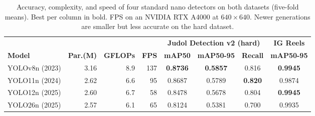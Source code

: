 \begin{table}[t]
\caption{Accuracy, complexity, and speed of four standard nano detectors on both datasets (five-fold means). Best per column in bold. FPS on an NVIDIA RTX A4000 at $640\times640$. Newer generations are smaller but less accurate on the hard dataset.}
\label{tab:main}
\centering\footnotesize\renewcommand{\arraystretch}{1.3}
\begin{tabular}{@{}lrrrcccc@{}}
\toprule
& & & & \multicolumn{3}{c}{\textbf{Judol Detection v2 (hard)}} & \textbf{IG Reels} \\
\cmidrule(lr){5-7}\cmidrule(lr){8-8}
\textbf{Model} & \textbf{Par.(M)} & \textbf{GFLOPs} & \textbf{FPS} & \textbf{mAP50} & \textbf{mAP50-95} & \textbf{Recall} & \textbf{mAP50-95} \\
\midrule
YOLOv8n (2023) & 3.16 & 8.9 & 137 & \textbf{0.8736} & \textbf{0.5857} & 0.816 & \textbf{0.9945} \\
YOLO11n (2024) & 2.62 & 6.6 & 95 & 0.8687 & 0.5789 & \textbf{0.820} & 0.9874 \\
YOLO12n (2025) & 2.60 & 6.7 & 58 & 0.8478 & 0.5678 & 0.804 & \textbf{0.9945} \\
YOLO26n (2025) & 2.57 & 6.1 & 65 & 0.8124 & 0.5381 & 0.700 & 0.9935 \\
\bottomrule
\end{tabular}
\end{table}
